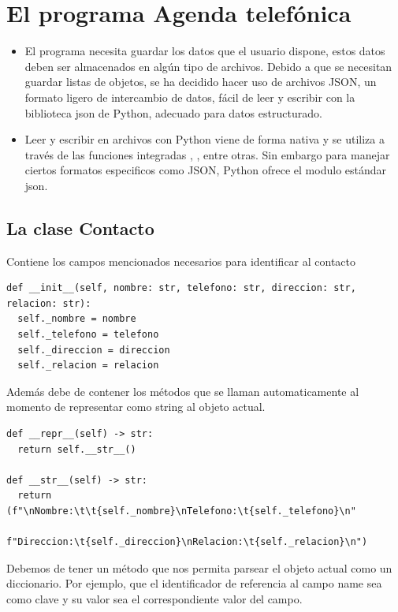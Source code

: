 \section{El programa Agenda telefónica}

\begin{itemize}
  \item El programa necesita guardar los datos que el usuario dispone, estos datos deben ser almacenados en algún tipo de archivos. Debido a que se necesitan guardar listas de objetos, se ha decidido hacer uso de archivos JSON, un formato ligero de intercambio de datos, fácil de leer y escribir con la biblioteca json de Python, adecuado para datos estructurado.
  \item Leer y escribir en archivos con Python viene de forma nativa y se utiliza a través de las funciones integradas , ,  entre otras. Sin embargo para manejar ciertos formatos especificos como JSON, Python ofrece el modulo estándar json.
\end{itemize}

\subsection{La clase Contacto}
Contiene los campos mencionados necesarios para identificar al contacto

\begin{verbatim}
def __init__(self, nombre: str, telefono: str, direccion: str, relacion: str):
  self._nombre = nombre
  self._telefono = telefono
  self._direccion = direccion
  self._relacion = relacion
\end{verbatim}

Además debe de contener los métodos que se llaman automaticamente al momento de representar como string al objeto actual.

\begin{verbatim}
def __repr__(self) -> str:
  return self.__str__()

def __str__(self) -> str:
  return (f"\nNombre:\t\t{self._nombre}\nTelefono:\t{self._telefono}\n"
          f"Direccion:\t{self._direccion}\nRelacion:\t{self._relacion}\n")
\end{verbatim}

Debemos de tener un método que nos permita parsear el objeto actual como un diccionario. Por ejemplo, que el identificador de referencia al campo name sea como clave y su valor sea el correspondiente valor del campo.

